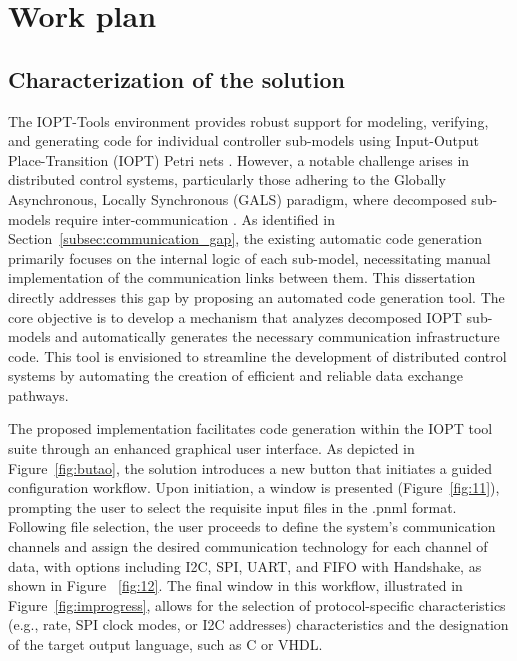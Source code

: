 
%

\chapter{Work plan}
\label{cha:work_plan}


\section{Characterization of the solution}
\label{sec:characterization_of_the_solution}

 The IOPT-Tools environment provides robust support for modeling, verifying, and generating code for individual controller sub-models using Input-Output Place-Transition (IOPT) Petri nets \cite{iopttools, barros2004, RefiningIOPT}. However, a notable challenge arises in distributed control systems, particularly those adhering to the Globally Asynchronous, Locally Synchronous (GALS) paradigm, where decomposed sub-models require inter-communication \cite{galsactd, Barrosadd}. As identified in Section~\ref{subsec:communication_gap}, the existing automatic code generation primarily focuses on the internal logic of each sub-model, necessitating manual implementation of the communication links between them. This dissertation directly addresses this gap by proposing an automated code generation tool. The core objective is to develop a mechanism that analyzes decomposed IOPT sub-models and automatically generates the necessary communication infrastructure code. This tool is envisioned to streamline the development of distributed control systems by automating the creation of efficient and reliable data exchange pathways. 
 
 
The proposed implementation facilitates code generation within the IOPT tool suite through an enhanced graphical user interface. As depicted in Figure~\ref{fig:butao}, the solution introduces a new button that initiates a guided configuration workflow. Upon initiation, a window is presented (Figure~\ref{fig:11}), prompting the user to select the requisite input files in the .pnml format. Following file selection, the user proceeds to define the system's communication channels and assign the desired communication technology for each channel of data, with options including I2C, SPI, UART, and FIFO with Handshake, as shown in Figure ~\ref{fig:12}. The final window in this workflow, illustrated in Figure~\ref{fig:improgress}, allows for the selection of protocol-specific characteristics (e.g., rate, SPI clock modes, or I2C addresses) characteristics and the designation of the target output language, such as C or VHDL.
 
